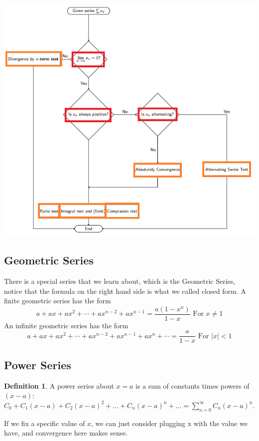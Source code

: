 \documentclass[12pt]{article}
\theoremstyle{definition}
\theoremstyle{definition}
\newtheorem{definition}{Definition}[section]
\theoremstyle{remark}
\theoremstyle{definition}
\theoremstyle{definition}
\theoremstyle{definition}
\begin{document}
\includegraphics[width=1\textwidth]{program.png}


\subsection{Geometric Series}
There is a special series that we learn about, which is the Geometric Series, notice that the formula on the right hand side is what we called closed form. 
A finite geometric series has the form
\[a + ax + ax^2 + \cdots + ax^{n−2} + ax^{n−1}=\frac{a(1-x^n)}{1-x}\text{ For } x \neq 1\]
An infinite geometric series has the form
\[a + ax + ax^2 + \cdots + ax^{n−2} + ax^{n−1}+ax^n +\cdots=\frac{a}{1-x}\text{ For } |x| < 1\]

\newpage

\subsection{Power Series}
\begin{definition}
	A power series about $x = a$ is a sum of constants times powers of $(x - a)$: \\
	$C_0 + C_1(x - a) + C_2(x - a)^2 + \ldots + C_n(x - a)^n + \ldots =	\sum_{n
	=0}^{\infty}	C_n(x - a)^n$.
\end{definition}

If we fix a specific value of $x$, we can just consider plugging x with the value we have, and convergence here makes sense.
\end{document}
